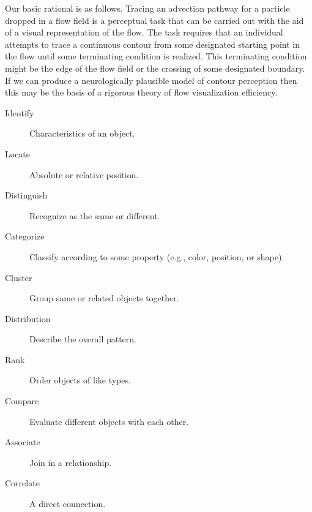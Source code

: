 Our basic rational is as follows. Tracing an advection pathway for a
particle dropped in a flow field is a perceptual task that can be
carried out with the aid of a visual representation of the flow.
The task requires that an individual attempts to trace a continuous
contour from some designated starting point in the flow until some
terminating condition is realized. This terminating condition might
be the edge of the flow field or the crossing of some designated
boundary. If we can produce a neurologically plausible model of
contour perception then this may be the basis of a rigorous theory of
flow visualization efficiency.
\begin{description}
    \item[Identify] Characteristics of an object.
    \item[Locate] Absolute or relative position.
    \item[Distinguish] Recognize as the same or different.
    \item[Categorize] Classify according to some property (e.g.,  color, position, or shape).
    \item[Cluster] Group same or related objects together.
    \item[Distribution] Describe the overall pattern.
    \item[Rank] Order objects of like types.
    \item[Compare] Evaluate different objects with each other.
    \item[Associate] Join in a relationship.
    \item[Correlate] A direct connection.
\end{description}

